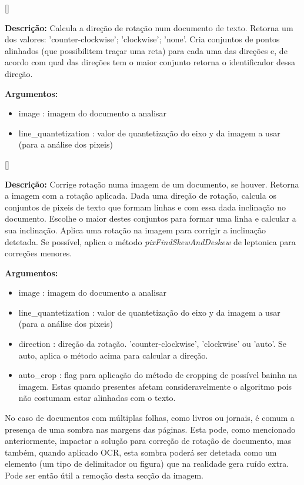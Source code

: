 [\normalsize]

\textbf{Descrição:} Calcula a direção de rotação num documento de texto. Retorna um dos valores: 'counter-clockwise'; 'clockwise'; 'none'. Cria conjuntos de pontos alinhados (que possibilitem traçar uma reta) para cada uma das direções e, de acordo com qual das direções tem o maior conjunto retorna o identificador dessa direção.

\textbf{Argumentos:}
\begin{itemize}\setlength\itemsep{-0.3em}
	\item image : imagem do documento a analisar
	\item line\_quantetization : valor de quantetização do eixo y da imagem a usar (para a análise dos pixeis) 
\end{itemize}

[\normalsize]

\textbf{Descrição:} Corrige rotação numa imagem de um documento, se houver. Retorna a imagem com a rotação aplicada. Dada uma direção de rotação, calcula os conjuntos de pixeis de texto que formam linhas e com essa dada inclinação no documento. Escolhe o maior destes conjuntos para formar uma linha e calcular a sua inclinação. Aplica uma rotação na imagem para corrigir a inclinação detetada. 
Se possível, aplica o método \textit{pixFindSkewAndDeskew} de leptonica para correções menores.

\textbf{Argumentos:}
\begin{itemize}\setlength\itemsep{-0.3em}
	\item image : imagem do documento a analisar
	\item line\_quantetization : valor de quantetização do eixo y da imagem a usar (para a análise dos pixeis) 
	\item direction : direção da rotação. 'counter-clockwise', 'clockwise' ou 'auto'. Se auto, aplica o método acima para calcular a direção.
	\item auto\_crop : flag para aplicação do método de cropping de possível bainha na imagem. Estas quando presentes afetam consideravelmente o algoritmo pois não costumam estar alinhadas com o texto.
\end{itemize}

\label{contribution_image_cut_argin_shadow}

No caso de documentos com múltiplas folhas, como livros ou jornais, é comum a presença de uma sombra nas margens das páginas. Esta pode, como mencionado anteriormente, impactar a solução para correção de rotação de documento, mas também, quando aplicado OCR, esta sombra poderá ser detetada como um elemento (um tipo de delimitador ou figura) que na realidade gera ruído extra. Pode ser então útil a remoção desta secção da imagem.

